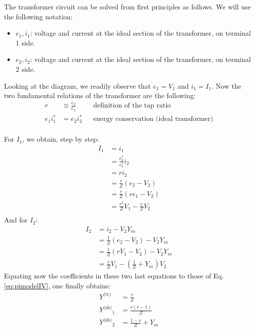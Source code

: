 \documentclass[a4paper,11pt]{article}
\newcommand{\Ytr}{\ensuremath{Y^{\textrm{(tr)}}}}
\newcommand{\Ysh}{\ensuremath{Y^{\textrm{(sh)}}}}
\begin{document}
The transformer circuit can be solved from first principles as follows. We will
use the following notation:
\begin{itemize}
\item $e_1, i_1$: voltage and current at the ideal section of the transformer,
  on terminal 1 side.
\item $e_2, i_2$: voltage and current at the ideal section of the transformer,
  on terminal 2 side.
\end{itemize}
Looking at the diagram, we readily observe that $e_1=V_1$ and $i_1=I_1$. Now the
two fundamental relations of the transformer are the following:
\begin{align*}
    r & \equiv \frac{e_2}{e_1}  &  & \text{definition of the tap ratio} \\
    e_1 i_1^* & = e_2 i_2^* &  & \text{energy conservation (ideal transformer)} \\
\end{align*}

For $I_1$, we obtain, step by step:
\begin{equation*}
  \begin{split}
    I_1 & = i_1 \\
    & = \frac{e_2^*}{e_1^*} i_2 \\
    & = r i_2 \\
    & = \frac{r}{Z} (e_2 - V_2) \\
    & = \frac{r}{Z} (r e_1 - V_2) \\
    & = \frac{r^2}{Z} V_1 - \frac{r}{Z} V_2 \\
  \end{split}
\end{equation*}
And for $I_2$:
\begin{equation*}
  \begin{split}
    I_2 & = i_2 - V_2 Y_m \\
    & = \frac{1}{Z} (e_2 - V_2) - V_2 Y_m \\
    & = \frac{1}{Z} (r V_1 - V_2) - V_2 Y_m \\
    & = \frac{r}{Z} V_1  - \left( \frac{1}{Z} + Y_m \right) V_2
  \end{split}
\end{equation*}
Equating now the coefficients in these two last equations to those of
Eq.\eqref{eq:pimodelIV}, one finally obtains:
\begin{equation}
  \begin{split}
    \Ytr & = \frac{r}{Z} \\
    \Ysh_1 & = \frac{r(r-1)}{Z} \\
    \Ysh_2 & = \frac{1-r}{Z} + Y_m
  \end{split}
\end{equation}
\end{document}

